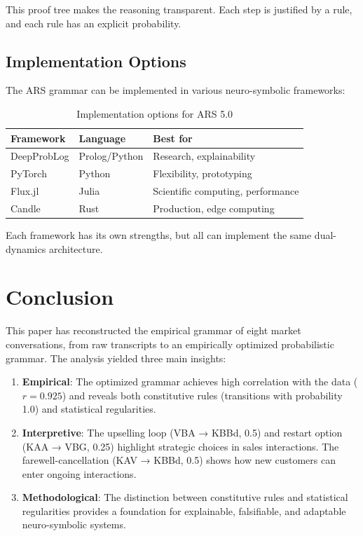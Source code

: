 \documentclass[12pt,a4paper]{article}
\begin{document}
This proof tree makes the reasoning transparent. Each step is justified by
a rule, and each rule has an explicit probability.

\subsection{Implementation Options}

The ARS grammar can be implemented in various neuro-symbolic frameworks:

\begin{table}[H]
\centering
\caption{Implementation options for ARS 5.0}
\label{tab:options}
\begin{tabular}{@{} l l l @{}}
\toprule
\textbf{Framework} & \textbf{Language} & \textbf{Best for} \\
\midrule
DeepProbLog & Prolog/Python & Research, explainability \\
PyTorch & Python & Flexibility, prototyping \\
Flux.jl & Julia & Scientific computing, performance \\
Candle & Rust & Production, edge computing \\
\bottomrule
\end{tabular}
\end{table}

Each framework has its own strengths, but all can implement the same
dual-dynamics architecture.

\section{Conclusion}

This paper has reconstructed the empirical grammar of eight market conversations,
from raw transcripts to an empirically optimized probabilistic grammar.
The analysis yielded three main insights:

\begin{enumerate}
    \item \textbf{Empirical}: The optimized grammar achieves high correlation
    with the data (\(r = 0.925\)) and reveals both constitutive rules
    (transitions with probability 1.0) and statistical regularities.
    
    \item \textbf{Interpretive}: The upselling loop (VBA → KBBd, 0.5) and
    restart option (KAA → VBG, 0.25) highlight strategic choices in sales
    interactions. The farewell-cancellation (KAV → KBBd, 0.5) shows how
    new customers can enter ongoing interactions.
    
    \item \textbf{Methodological}: The distinction between constitutive rules
    and statistical regularities provides a foundation for explainable,
    falsifiable, and adaptable neuro-symbolic systems.
\end{enumerate}
\end{document}
